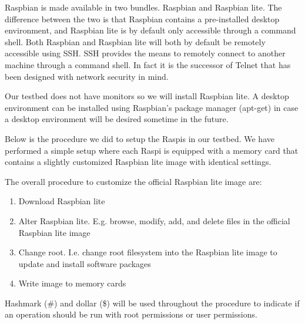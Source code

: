 



Raspbian is made available in two bundles. Raspbian and Raspbian lite.
The difference between the two is that Raspbian contains a pre-installed desktop
environment, and Raspbian lite is by default only accessible through a 
command shell. 
Both Raspbian and Raspbian lite will both by default be remotely
accessible using \ac{SSH}. \ac{SSH} provides the means to remotely
connect to another machine through a command shell. In fact it is the successor
of \ac{Telnet} that has been designed with network security in mind.

Our testbed does not have monitors so we will install Raspbian lite.
A desktop environment can be installed using Raspbian's package manager
(apt-get) in case a desktop environment will be desired sometime in the future.

Below is the procedure we did to setup the \ac{Raspi}s in our testbed. We
have performed a simple setup where each \ac{Raspi} is equipped with a
memory card that contains a slightly customized Raspbian lite image with
identical settings. 


The overall procedure to customize the official Raspbian lite image
are:
\begin{enumerate}
    \item Download Raspbian lite
    \item Alter Raspbian lite. E.g. browse, modify, add, and delete files
        in the official Raspbian lite image
    \item Change root. I.e. change root filesystem into the Raspbian lite
        image to update and install software packages
    \item Write image to memory cards
\end{enumerate}

Hashmark (\#) and dollar (\$) will be used throughout the procedure
to indicate if an operation should be run with root permissions or
user permissions.

